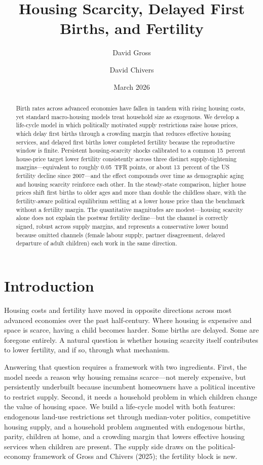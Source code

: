 \documentclass[11pt]{article}
\title{Housing Scarcity, Delayed First Births, and Fertility}
\author{David Gross \and David Chivers}
\date{March 2026}
\begin{document}
\maketitle

\begin{abstract}
Birth rates across advanced economies have fallen in tandem with rising housing costs, yet
standard macro-housing models treat household size as exogenous. We develop a life-cycle
model in which politically motivated supply restrictions raise house prices, which delay
first births through a crowding margin that reduces effective housing services, and delayed
first births lower completed fertility because the reproductive window is finite.
Persistent housing-scarcity shocks calibrated to a common 15~percent house-price target
lower fertility consistently across three distinct supply-tightening margins---equivalent
to roughly 0.05~TFR points, or about 13~percent of the US fertility decline since
2007---and the effect compounds over time as demographic aging and housing scarcity
reinforce each other. In the steady-state comparison, higher house prices shift first
births to older ages and more than double the childless share, with the fertility-aware
political equilibrium settling at a lower house price than the benchmark without a
fertility margin. The quantitative magnitudes are modest---housing scarcity alone does not
explain the postwar fertility decline---but the channel is correctly signed, robust across
supply margins, and represents a conservative lower bound because omitted channels
(female labour supply, partner disagreement, delayed departure of adult children) each
work in the same direction.
\end{abstract}

\section{Introduction}

Housing costs and fertility have moved in opposite directions across most advanced economies
over the past half-century. Where housing is expensive and space is scarce, having a child
becomes harder. Some births are delayed. Some are foregone entirely. A natural question is
whether housing scarcity itself contributes to lower fertility, and if so, through what
mechanism.

Answering that question requires a framework with two ingredients. First, the model needs a
reason why housing remains scarce---not merely expensive, but persistently underbuilt because
incumbent homeowners have a political incentive to restrict supply. Second, it needs a
household problem in which children change the value of housing space. We build a life-cycle
model with both features: endogenous land-use restrictions set through median-voter politics,
competitive housing supply, and a household problem augmented with endogenous births, parity,
children at home, and a crowding margin that lowers effective housing services when children
are present. The supply side draws on the political-economy framework of Gross and Chivers
(2025); the fertility block is new.
\end{document}
